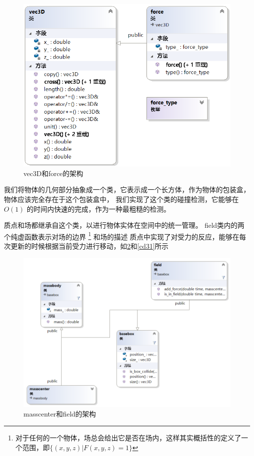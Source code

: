 \begin{figure} 
    \centering 
    \includegraphics[width=.8\textwidth]{ClassDiagram1.png}
\caption{vec3D和force的架构} %
\label{cd1} %
\end{figure}

我们将物体的几何部分抽象成一个类，它表示成一个长方体，作为物体的包装盒，物体应该完全存在于这个包装盒中，
我们实现了这个类的碰撞检测，它能够在 $ O(1) $ 的时间内快速的完成，作为一种最粗糙的检测。


质点和场都继承自这个类，以进行物体实体在空间中的统一管理。
field类内的两个纯虚函数表示对场的边界
\footnote{对于任何的一个物体，场总会给出它是否在场内，这样其实概括性的定义了一个范围，即$ \{(x,y,z)|F(x,y,z)=1\} $}
和场的描述
质点中实现了对受力的反应，能够在每次更新的时候根据当前受力进行移动，如\ref{cd2}和\ref{cd31}所示

\begin{figure} 
    \centering 
    \includegraphics[width=.9\textwidth]{ClassDiagram2.png}
\caption{masscenter和field的架构} %
\label{cd2} %
\end{figure}

